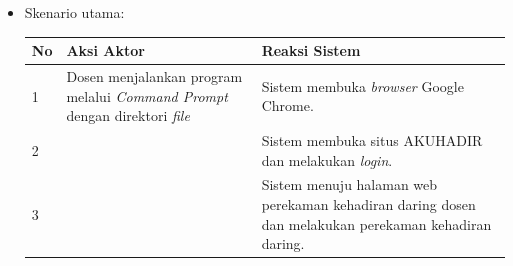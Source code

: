 \begin{enumerate}
\begin{itemize}
		\item Skenario utama:
		\begin{table}[h!]
			\centering
			\label{}
			\begin{tabular}{ | m{0.5cm} | m{7cm}| m{6cm} | } 
				\hline
				No & Aksi Aktor & Reaksi Sistem \\ 
				\hline
				1 & Dosen menjalankan program melalui \textit{Command Prompt} dengan direktori \textit{file} & Sistem membuka \textit{browser} Google Chrome.
				\\ 
				\hline
				2 &  & Sistem membuka situs AKUHADIR dan melakukan \textit{login}.
				\\ 
				\hline
				3 &  & Sistem menuju halaman web perekaman kehadiran daring dosen dan melakukan perekaman kehadiran daring.
				\\ 
				\hline
			\end{tabular}
		\end{table}	
	\end{itemize}
\end{enumerate}
